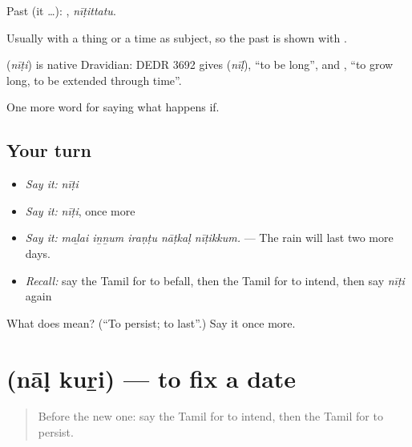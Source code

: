 Past (it …): , \emph{nīṭittatu}.

Usually with a thing or a time as subject, so the past is shown with .

\begin{cousinweb}
\textbf{} (\emph{nīṭi}) is native Dravidian: DEDR 3692 gives  (\emph{nīḷ}), \textquotedblleft{}to be long\textquotedblright{}, and , \textquotedblleft{}to grow long, to be extended through time\textquotedblright{}.
\end{cousinweb}

\begin{grammarlens}[title={What you've built}]
One more word for saying what happens if.
\end{grammarlens}

\subsection*{Your turn}
\begin{itemize}
\raggedright
  \item \emph{Say it:} \emph{nīṭi}
  \item \emph{Say it:} \emph{nīṭi}, once more
  \item \emph{Say it:} \emph{maḻai iṉṉum iraṇṭu nāṭkaḷ nīṭikkum.} — The rain will last two more days.
  \item \emph{Recall:} say the Tamil for to befall, then the Tamil for to intend, then say \emph{nīṭi} again
\end{itemize}

\begin{tcolorbox}[breakable,colback=teal!4,colframe=teal!35!black,title={Before you move on}]
What does  mean? (\textquotedblleft{}To persist; to last\textquotedblright{}.) Say it once more.
\end{tcolorbox}
\section[\texorpdfstring{\ta{நாள்} \ta{குறி} (nāḷ kuṟi)}{நாள் குறி (nāḷ kuṟi)}]{  (nāḷ kuṟi) — to fix a date}

\label{lesson:TA-C547-nal-kuri}



\begin{quote}
Before the new one: say the Tamil for to intend, then the Tamil for to persist.
\end{quote}

